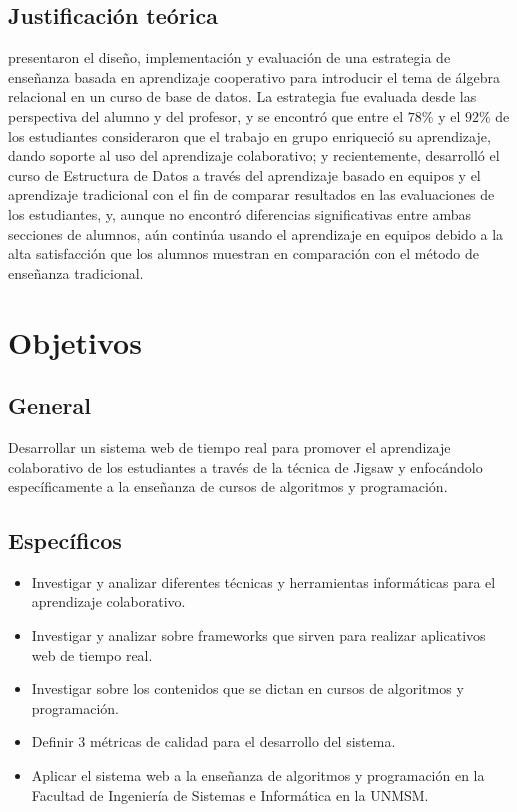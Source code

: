 \subsection{Justificación teórica}
 presentaron el diseño, implementación y evaluación de una estrategia de enseñanza basada en aprendizaje cooperativo para introducir el tema de álgebra relacional en un curso de base de datos. La estrategia fue evaluada desde las perspectiva del alumno y del profesor, y se encontró que entre el $78\%$ y el $92\%$ de los estudiantes consideraron que el trabajo en grupo enriqueció su aprendizaje, dando soporte al uso del aprendizaje colaborativo; y recientemente,  desarrolló el curso de Estructura de Datos a través del aprendizaje basado en equipos y el aprendizaje tradicional con el fin de comparar resultados en las evaluaciones de los estudiantes, y, aunque no encontró diferencias significativas entre ambas secciones de alumnos, aún continúa usando el aprendizaje en equipos debido a la alta satisfacción que los alumnos muestran en comparación con el método de enseñanza tradicional.\\


\section{Objetivos}
\subsection{General}
Desarrollar un sistema web de tiempo real para promover el aprendizaje colaborativo de los estudiantes a través de la técnica de Jigsaw y enfocándolo específicamente a la enseñanza de cursos de algoritmos y programación.
\subsection{Específicos}
\begin{itemize}
  \item Investigar y analizar diferentes técnicas y herramientas informáticas para el aprendizaje colaborativo.
  \item Investigar y analizar sobre frameworks que sirven para realizar aplicativos web de tiempo real.
  \item Investigar sobre los contenidos que se dictan en cursos de algoritmos y programación.
  \item Definir 3 métricas de calidad para el desarrollo del sistema.
  \item Aplicar el sistema web a la enseñanza de algoritmos y programación en la Facultad de Ingeniería de Sistemas e Informática en la UNMSM.
\end{itemize}


